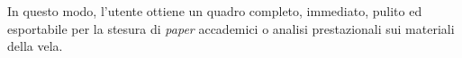 In questo modo, l'utente ottiene un quadro completo, immediato, pulito ed esportabile per la stesura di \textit{paper} accademici o analisi prestazionali sui materiali della vela.

